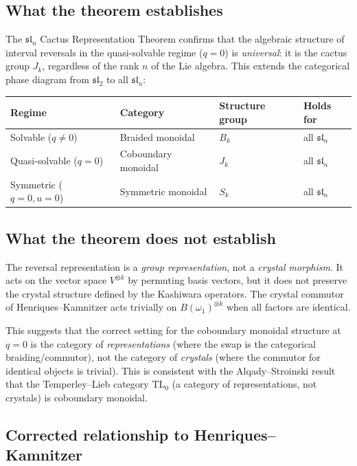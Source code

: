 \documentclass[11pt]{article}
\theoremstyle{remark}
\begin{document}
\subsection{What the theorem establishes}

The $\mathfrak{sl}_n$ Cactus Representation Theorem confirms that the
algebraic structure of interval reversals in the quasi-solvable regime
($q = 0$) is \emph{universal}: it is the cactus group $J_k$, regardless
of the rank $n$ of the Lie algebra. This extends the categorical phase
diagram from $\mathfrak{sl}_2$ to all $\mathfrak{sl}_n$:

\begin{center}
\renewcommand{\arraystretch}{1.3}
\begin{tabular}{@{}llll@{}}
  \toprule
  Regime & Category & Structure group & Holds for \\
  \midrule
  Solvable ($q \neq 0$) & Braided monoidal & $B_k$ & all $\mathfrak{sl}_n$ \\
  Quasi-solvable ($q = 0$) & Coboundary monoidal & $J_k$ & all $\mathfrak{sl}_n$ \\
  Symmetric ($q = 0, u = 0$) & Symmetric monoidal & $S_k$ & all $\mathfrak{sl}_n$ \\
  \bottomrule
\end{tabular}
\end{center}

\subsection{What the theorem does not establish}

The reversal representation is a \emph{group representation}, not a
\emph{crystal morphism}. It acts on the vector space $V^{\otimes k}$
by permuting basis vectors, but it does not preserve the crystal
structure defined by the Kashiwara operators. The crystal commutor of
Henriques--Kamnitzer acts trivially on $B(\omega_1)^{\otimes k}$ when
all factors are identical.

This suggests that the correct setting for the coboundary monoidal
structure at $q = 0$ is the category of \emph{representations}
(where the swap is the categorical braiding/commutor), not the category
of \emph{crystals} (where the commutor for identical objects is trivial).
This is consistent with the Alqady--Stroinski result that the
Temperley--Lieb category $\mathrm{TL}_0$ (a category of representations,
not crystals) is coboundary monoidal.

\subsection{Corrected relationship to Henriques--Kamnitzer}
\end{document}

